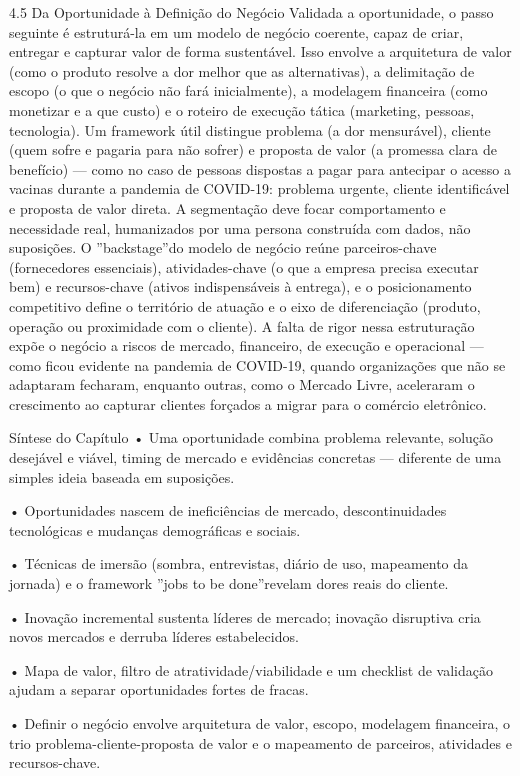 4.5 Da Oportunidade à Definição do Negócio Validada a oportunidade, o passo seguinte é estruturá-la em um modelo de negócio coerente, capaz de criar, entregar e capturar valor de forma sustentável. Isso envolve a arquitetura de valor (como o produto resolve a dor melhor que as alternativas), a delimitação de escopo (o que o negócio não fará inicialmente), a modelagem financeira (como monetizar e a que custo) e o roteiro de execução tática (marketing, pessoas, tecnologia). Um framework útil distingue problema (a dor mensurável), cliente (quem sofre e pagaria para não sofrer) e proposta de valor (a promessa clara de benefício) — como no caso de pessoas dispostas a pagar para antecipar o acesso a vacinas durante a pandemia de COVID-19: problema urgente, cliente identificável e proposta de valor direta. A segmentação deve focar comportamento e necessidade real, humanizados por uma persona construída com dados, não suposições. O ”backstage”do modelo de negócio reúne parceiros-chave (fornecedores essenciais), atividades-chave (o que a empresa precisa executar bem) e recursos-chave (ativos indispensáveis à entrega), e o posicionamento competitivo define o território de atuação e o eixo de diferenciação (produto, operação ou proximidade com o cliente). A falta de rigor nessa estruturação expõe o negócio a riscos de mercado, financeiro, de execução e operacional — como ficou evidente na pandemia de COVID-19, quando organizações que não se adaptaram fecharam, enquanto outras, como o Mercado Livre, aceleraram o crescimento ao capturar clientes forçados a migrar para o comércio eletrônico.

Síntese do Capítulo • Uma oportunidade combina problema relevante, solução desejável e viável, timing de mercado e evidências concretas — diferente de uma simples ideia baseada em suposições.

• Oportunidades nascem de ineficiências de mercado, descontinuidades tecnológicas e mudanças demográficas e sociais.

• Técnicas de imersão (sombra, entrevistas, diário de uso, mapeamento da jornada) e o framework ”jobs to be done”revelam dores reais do cliente.

• Inovação incremental sustenta líderes de mercado; inovação disruptiva cria novos mercados e derruba líderes estabelecidos.

• Mapa de valor, filtro de atratividade/viabilidade e um checklist de validação ajudam a separar oportunidades fortes de fracas.

• Definir o negócio envolve arquitetura de valor, escopo, modelagem financeira, o trio problema-cliente-proposta de valor e o mapeamento de parceiros, atividades e recursos-chave.

